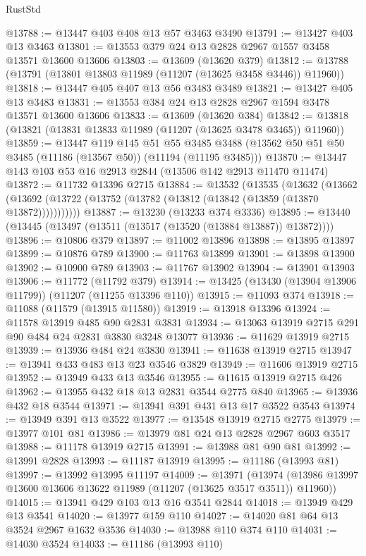 \begin{lexlean}{RustStd}
\begin{coremodule}
@13788 := @13447 @403 @408 @13 @57 @3463 @3490
@13791 := @13427 @403 @13 @3463
@13801 := @13553 @379 @24 @13 @2828 @2967 @1557 @3458 @13571 @13600 @13606
@13803 := @13609 (@13620 @379)
@13812 := @13788 (@13791 (@13801 @13803 @11989 (@11207 (@13625 @3458 @3446)) @11960))
@13818 := @13447 @405 @407 @13 @56 @3483 @3489
@13821 := @13427 @405 @13 @3483
@13831 := @13553 @384 @24 @13 @2828 @2967 @1594 @3478 @13571 @13600 @13606
@13833 := @13609 (@13620 @384)
@13842 := @13818 (@13821 (@13831 @13833 @11989 (@11207 (@13625 @3478 @3465)) @11960))
@13859 := @13447
    @119
    @145
    @51
    @55
    @3485
    @3488
    (@13562 @50 @51 @50 @3485 (@11186 (@13567 @50)) (@11194 (@11195 @3485)))
@13870 := @13447 @143 @103 @53 @16 @2913 @2844 (@13506 @142 @2913 @11470 @11474)
@13872 := @11732 @13396 @2715
@13884 := @13532
    (@13535
      (@13632
        (@13662 (@13692 (@13722 (@13752 (@13782 (@13812 (@13842 (@13859 (@13870 @13872)))))))))))
@13887 := @13230 (@13233 @374 @3336)
@13895 := @13440 (@13445 (@13497 (@13511 (@13517 (@13520 (@13884 @13887)) @13872))))
@13896 := @10806 @379
@13897 := @11002 @13896
@13898 := @13895 @13897
@13899 := @10876 @789
@13900 := @11763 @13899
@13901 := @13898 @13900
@13902 := @10900 @789
@13903 := @11767 @13902
@13904 := @13901 @13903
@13906 := @11772 (@11792 @379)
@13914 := @13425 (@13430 (@13904 @13906 @11799)) (@11207 (@11255 @13396 @110))
@13915 := @11093 @374
@13918 := @11088 (@11579 (@13915 @11580))
@13919 := @13918 @13396
@13924 := @11578 @13919 @485 @90 @2831 @3831
@13934 := @13063 @13919 @2715 @291 @90 @484 @24 @2831 @3830 @3248 @13077
@13936 := @11629 @13919 @2715
@13939 := @13936 @484 @24 @3830
@13941 := @11638 @13919 @2715
@13947 := @13941 @433 @483 @13 @23 @3546 @3829
@13949 := @11606 @13919 @2715
@13952 := @13949 @433 @13 @3546
@13955 := @11615 @13919 @2715 @426
@13962 := @13955 @432 @18 @13 @2831 @3544 @2775 @840
@13965 := @13936 @432 @18 @3544
@13971 := @13941 @391 @431 @13 @17 @3522 @3543
@13974 := @13949 @391 @13 @3522
@13977 := @13548 @13919 @2715 @2775
@13979 := @13977 @101 @81
@13986 := @13979 @81 @24 @13 @2828 @2967 @603 @3517
@13988 := @11178 @13919 @2715
@13991 := @13988 @81 @90 @81
@13992 := @13991 @2828
@13993 := @11187 @13919
@13995 := @11186 (@13993 @81)
@13997 := @13992 @13995 @11197
@14009 := @13971
    (@13974 (@13986 @13997 @13600 @13606 @13622 @11989 (@11207 (@13625 @3517 @3511)) @11960))
@14015 := @13941 @429 @103 @13 @16 @3541 @2844
@14018 := @13949 @429 @13 @3541
@14020 := @13977 @159 @110
@14027 := @14020 @81 @64 @13 @3524 @2967 @1632 @3536
@14030 := @13988 @110 @374 @110
@14031 := @14030 @3524
@14033 := @11186 (@13993 @110)

\end{coremodule}
\end{lexlean}
